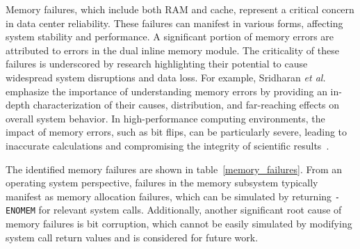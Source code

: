 Memory failures, which include both RAM and cache, represent a critical concern in data center reliability. These failures can manifest in various forms, affecting system stability and performance. A significant portion of memory errors are attributed to errors in the dual inline memory module. The criticality of these failures is underscored by research highlighting their potential to cause widespread system disruptions and data loss. For example, Sridharan \textit{et al.}~\cite{sridharan2015mem} emphasize the importance of understanding memory errors by providing an in-depth characterization of their causes, distribution, and far-reaching effects on overall system behavior. In high-performance computing environments, the impact of memory errors, such as bit flips, can be particularly severe, leading to inaccurate calculations and compromising the integrity of scientific results~\cite{utrera2018hpc}.

\begin{table}[ht]
\centering
\caption{Memory Failures (RAM \& Cache)}
\label{memory_failures}
\end{table}

The identified memory failures are shown in table~\ref{memory_failures}. From an operating system perspective, failures in the memory subsystem typically manifest as memory allocation failures, which can be simulated by returning \texttt{-ENOMEM} for relevant system calls. Additionally, another significant root cause of memory failures is bit corruption, which cannot be easily simulated by modifying system call return values and is considered for future work.

